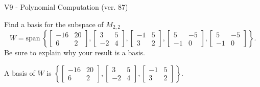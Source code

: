 \begin{exercise}
  \begin{exerciseTitle}V9 - Polynomial Computation (ver. 87)\end{exerciseTitle}
  \begin{exerciseStatement}
    Find a basis for the subspace of \(M_{2,2}\) 
\[W=\mathrm{span}\ \left\{\left[\begin{array}{cc}
-16 & 20 \\
6 & 2
\end{array}\right] , \left[\begin{array}{cc}
3 & 5 \\
-2 & 4
\end{array}\right] , \left[\begin{array}{cc}
-1 & 5 \\
3 & 2
\end{array}\right] , \left[\begin{array}{cc}
5 & -5 \\
-1 & 0
\end{array}\right] , \left[\begin{array}{cc}
5 & -5 \\
-1 & 0
\end{array}\right]\right\}.\]
 Be sure to explain why your result is a basis.


  \end{exerciseStatement}
  \begin{exerciseAnswer}
   A basis of \(W\) is  \(\left\{\left[\begin{array}{cc}
-16 & 20 \\
6 & 2
\end{array}\right] , \left[\begin{array}{cc}
3 & 5 \\
-2 & 4
\end{array}\right] , \left[\begin{array}{cc}
-1 & 5 \\
3 & 2
\end{array}\right]\right\}\).
  


  \end{exerciseAnswer}
\end{exercise}